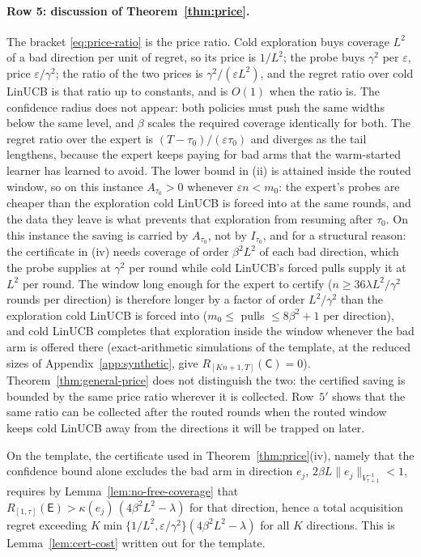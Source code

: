 \documentclass[anon]{alt2027} %
\newcommand{\eps}{\varepsilon}
\newcommand{\Cold}{\mathsf{C}}
\newcommand{\Exp}{\mathsf{E}}
\begin{document}
\paragraph{Row 5: discussion of Theorem~\ref{thm:price}.}
The bracket \eqref{eq:price-ratio} is the price ratio. Cold exploration buys
coverage $L^2$ of a bad direction per unit of regret, so its price is $1/L^2$;
the probe buys $\gamma^2$ per $\eps$, price $\eps/\gamma^2$; the ratio of the two prices
is $\gamma^2/(\eps L^2)$, and the regret ratio over cold LinUCB is that ratio up to
constants, and is $O(1)$ when the ratio is. The confidence radius does not
appear: both policies must push the same widths below the same level, and
$\beta$ scales the required coverage identically for both. The regret ratio
over the expert is $(T-\tau_0)/(\eps\tau_0)$ and diverges as the tail
lengthens, because the expert keeps paying for bad arms that the warm-started
learner has learned to avoid. The lower bound in (ii) is attained inside the
routed window, so on this instance $A_{\tau_0}>0$ whenever $\eps n<m_0$: the
expert's probes are cheaper than the exploration cold LinUCB is forced into
at the same rounds, and the data they leave is what prevents that exploration
from resuming after $\tau_0$. On this instance the saving is carried by
$A_{\tau_0}$, not by $I_{\tau_0}$, and for a structural reason: the
certificate in (iv) needs coverage of order $\beta^2L^2$ of each bad
direction, which the probe supplies at $\gamma^2$ per round while cold LinUCB's
forced pulls supply it at $L^2$ per round. The window long enough for the
expert to certify ($n\ge36\lambda L^2/\gamma^2$ rounds per direction) is therefore
longer by a factor of order $L^2/\gamma^2$ than the exploration cold LinUCB is
forced into ($m_0\le$ pulls $\le 8\beta^2+1$ per direction), and cold LinUCB
completes that exploration inside the window whenever the bad arm is offered
there (exact-arithmetic simulations of the template, at the reduced sizes of
Appendix~\ref{app:synthetic}, give $R_{[Kn+1,T]}(\Cold)=0$). Theorem~\ref{thm:general-price}
does not distinguish the two: the certified saving is bounded by the
same price ratio wherever it is collected. Row~$5'$ shows that the same ratio
can be collected after the routed rounds when the routed window keeps cold
LinUCB away from the directions it will be trapped on later.

\begin{remark}
On the template, the certificate used in Theorem~\ref{thm:price}(iv), namely
that the confidence bound alone excludes the bad arm in direction $e_j$,
$2\beta L\|e_j\|_{V_{\tau+1}^{-1}}<1$, requires by
Lemma~\ref{lem:no-free-coverage} that
$R_{[1,\tau]}(\Exp)>\kappa(e_j)\,(4\beta^2L^2-\lambda)$ for that direction, hence
a total acquisition regret exceeding
$K\min\{1/L^2,\eps/\gamma^2\}(4\beta^2L^2-\lambda)$ for all $K$ directions. This is
Lemma~\ref{lem:cert-cost} written out for the template.
\end{remark}
\end{document}
